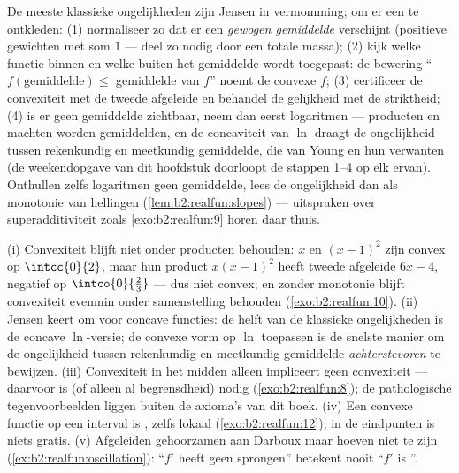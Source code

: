 \begin{method}\label{met:b2:realfun:spotting}
De meeste klassieke ongelijkheden zijn Jensen in vermomming; om er
een te ontkleden: (1) normaliseer zo dat er een \emph{gewogen
gemiddelde} verschijnt (positieve gewichten met som $1$ --- deel
zo nodig door een totale massa); (2) kijk welke functie binnen en
welke buiten het gemiddelde wordt toegepast: de bewering
``$f(\text{gemiddelde}) \leq$ gemiddelde van $f$'' noemt de convexe
$f$; (3) certificeer de convexiteit met de tweede afgeleide en
behandel de gelijkheid met de striktheid; (4) is er geen gemiddelde
zichtbaar, neem dan eerst logaritmen --- producten en machten
worden gemiddelden, en de concaviteit van $\ln$ draagt de
ongelijkheid tussen rekenkundig en meetkundig gemiddelde, die van
Young en hun verwanten (de weekendopgave van dit hoofdstuk doorloopt
de stappen 1--4 op elk ervan). Onthullen zelfs logaritmen geen
gemiddelde, lees de ongelijkheid dan als monotonie van hellingen
(\cref{lem:b2:realfun:slopes}) --- uitspraken over
superadditiviteit zoals \cref{exo:b2:realfun:9} horen daar
thuis.
\end{method}

\begin{remark}\label{rem:b2:realfun:pitfalls}
(i) Convexiteit blijft niet onder producten behouden: $x$ en $(x -
1)^2$ zijn convex op $\intcc{0}{2}$, maar hun product $x(x-1)^2$
heeft tweede afgeleide $6x - 4$, negatief op $\intco{0}{\frac23}$
--- dus niet convex; en zonder monotonie blijft convexiteit
evenmin onder samenstelling behouden (\cref{exo:b2:realfun:10}).
(ii) Jensen keert om voor concave functies: de helft van de
klassieke ongelijkheden is de concave $\ln$-versie; de convexe vorm
op $\ln$ toepassen is de snelste manier om de ongelijkheid tussen
rekenkundig en meetkundig gemiddelde \emph{achterstevoren} te
bewijzen. (iii) Convexiteit in het midden alleen impliceert geen
convexiteit --- daarvoor is  (of alleen al
begrensdheid) nodig (\cref{exo:b2:realfun:8}); de pathologische
tegenvoorbeelden liggen buiten de axioma's van dit boek. (iv) Een
convexe functie op een \emph{} interval is , zelfs
lokaal  (\cref{exo:b2:realfun:12}); in de eindpunten is
niets gratis. (v) Afgeleiden gehoorzamen aan Darboux maar hoeven
niet  te zijn (\cref{ex:b2:realfun:oscillation}): ``$f'$
heeft geen sprongen'' betekent nooit ``$f'$ is ''.
\end{remark}

